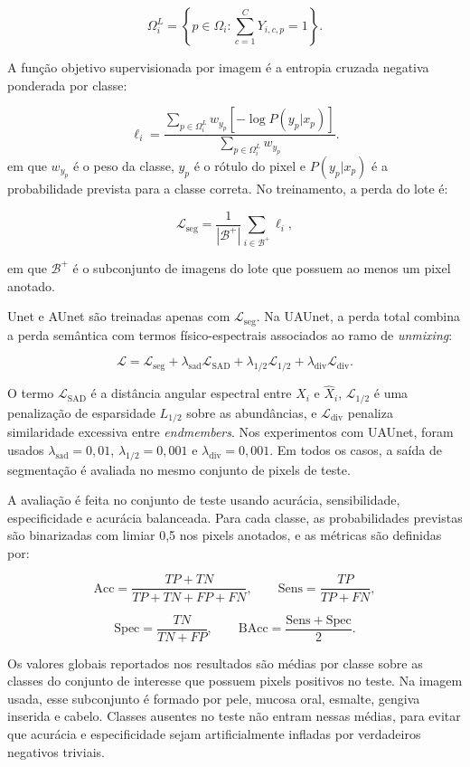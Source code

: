 \documentclass[conference]{IEEEtran}
\begin{document}
\[
\Omega_i^{L}=
\left\{p\in\Omega_i:\sum_{c=1}^{C}Y_{i,c,p}=1\right\}.
\]

A função objetivo supervisionada por imagem é a entropia cruzada negativa
ponderada por classe:

\[
\ell_i =
\frac{
\sum_{p \in \Omega_i^{L}}
w_{y_p}\left[-\log P(y_p|x_p)\right]
}{
\sum_{p \in \Omega_i^{L}} w_{y_p}
}.
\]
em que $w_{y_p}$ é o peso da classe, $y_p$ é o rótulo do pixel e $P(y_p|x_p)$ é
a probabilidade prevista para a classe correta. No treinamento, a perda do lote
é:

\[
\mathcal{L}_{\mathrm{seg}} =
\frac{1}{|\mathcal{B}^{+}|}
\sum_{i\in\mathcal{B}^{+}}\ell_i,
\]

em que $\mathcal{B}^{+}$ é o subconjunto de imagens do lote que possuem ao
menos um pixel anotado.

Unet e AUnet são treinadas apenas com
$\mathcal{L}_{\mathrm{seg}}$. Na UAUnet, a perda total combina a perda semântica
com termos físico-espectrais associados ao ramo de \textit{unmixing}:

\[
\mathcal{L} =
\mathcal{L}_{\mathrm{seg}}
+ \lambda_{\mathrm{sad}}\mathcal{L}_{\mathrm{SAD}}
+ \lambda_{1/2}\mathcal{L}_{1/2}
+ \lambda_{\mathrm{div}}\mathcal{L}_{\mathrm{div}}.
\]

O termo $\mathcal{L}_{\mathrm{SAD}}$ é a distância angular espectral entre
$X_i$ e $\hat{X}_i$, $\mathcal{L}_{1/2}$ é uma penalização de esparsidade
$L_{1/2}$ sobre as abundâncias, e $\mathcal{L}_{\mathrm{div}}$ penaliza
similaridade excessiva entre \textit{endmembers}. Nos experimentos com UAUnet,
foram usados $\lambda_{\mathrm{sad}}=0{,}01$,
$\lambda_{1/2}=0{,}001$ e $\lambda_{\mathrm{div}}=0{,}001$. Em todos os casos,
a saída de segmentação é avaliada no mesmo conjunto de pixels de teste.

A avaliação é feita no conjunto de teste usando acurácia, sensibilidade,
especificidade e acurácia balanceada. Para cada classe, as probabilidades
previstas são binarizadas com limiar 0,5 nos pixels anotados, e as métricas são
definidas por:

\[
\mathrm{Acc}=\frac{TP+TN}{TP+TN+FP+FN},\qquad
\mathrm{Sens}=\frac{TP}{TP+FN},
\]

\[
\mathrm{Spec}=\frac{TN}{TN+FP},\qquad
\mathrm{BAcc}=\frac{\mathrm{Sens}+\mathrm{Spec}}{2}.
\]

Os valores globais reportados nos resultados são médias por classe sobre as
classes do conjunto de interesse que possuem pixels positivos no teste. Na
imagem usada, esse subconjunto é formado por pele, mucosa oral, esmalte,
gengiva inserida e cabelo. Classes ausentes no teste não entram nessas médias,
para evitar que acurácia e especificidade sejam artificialmente infladas por
verdadeiros negativos triviais.
\end{document}
